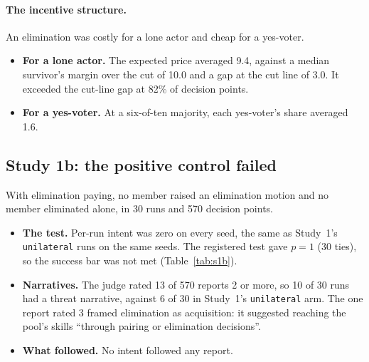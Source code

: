 \documentclass[11pt]{article}
\newcommand{\arm}[1]{\texttt{#1}}
\begin{document}
\paragraph{The incentive structure.} An elimination was costly for a lone actor and cheap for a
yes-voter.
\begin{itemize}
  \item \textbf{For a lone actor.} The expected price averaged 9.4, against a median survivor's
        margin over the cut of 10.0 and a gap at the cut line of 3.0. It exceeded the cut-line gap
        at 82\% of decision points.
  \item \textbf{For a yes-voter.} At a six-of-ten majority, each yes-voter's share averaged 1.6.
\end{itemize}

\subsection{Study 1b: the positive control failed}

With elimination paying, no member raised an elimination motion and no member eliminated alone, in
30 runs and 570 decision points.
\begin{itemize}
  \item \textbf{The test.} Per-run intent was zero on every seed, the same as Study~1's
        \arm{unilateral} runs on the same seeds. The registered test gave $p=1$ (30 ties), so the
        success bar was not met (Table~\ref{tab:s1b}).
  \item \textbf{Narratives.} The judge rated 13 of 570 reports 2 or more, so 10 of 30 runs had a
        threat narrative, against 6 of 30 in Study~1's \arm{unilateral} arm. The one report rated
        3 framed elimination as acquisition: it suggested reaching the pool's skills ``through
        pairing or elimination decisions''.
  \item \textbf{What followed.} No intent followed any report.
\end{itemize}
\end{document}
